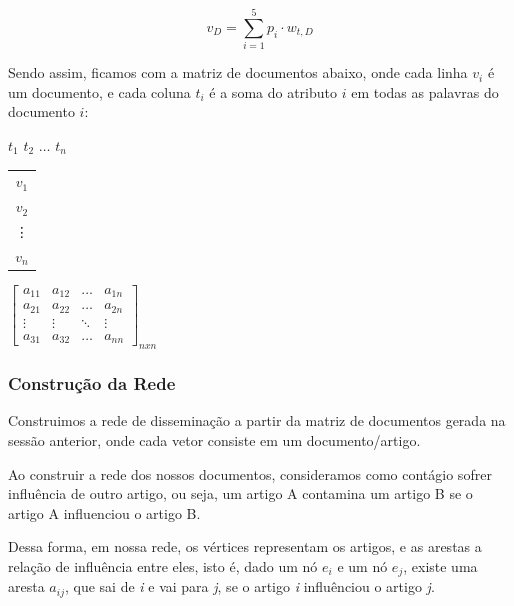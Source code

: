 \documentclass[a4paper,12pt]{article}
\begin{document}
  $$v_{D} = \sum_{i=1}^{5} p_{i} \cdot w_{t,D} $$

Sendo assim, ficamos com a matriz de documentos abaixo, onde cada linha $v_{i}$ é um documento, e cada coluna $t_{i}$ é a soma do atributo $i$
em todas as palavras do documento $i$:

 \begin{center}
 \hspace{0.2cm}$t_{1}$ \hspace{0.5cm} $t_{2}$ \hspace{0.3cm} $\hdots$ \hspace{0.4cm}$t_{n}$
 
 \vspace{0.2cm}
 
\begin{tabular}{c}
   $v_{1}$ \\
   $v_{2}$ \\
   \vdots\\
   $v_{n}$
 \end{tabular}
 $
 \begin{bmatrix}
  a_{11} & a_{12} & \hdots & a_{1n}\\
  a_{21} & a_{22} & \hdots & a_{2n}\\
  \vdots & \vdots & \ddots & \vdots\\
  a_{31} & a_{32} & \hdots & a_{nn}
 \end{bmatrix}_{nxn}
$

\end{center}



\subsubsection{Construção da Rede}

 Construimos a rede de disseminação a partir da matriz de documentos gerada na sessão anterior, onde cada vetor consiste em um documento/artigo.
 
 Ao construir a rede dos nossos documentos,
 consideramos como contágio sofrer influência de outro artigo, ou seja, um artigo A contamina um artigo B se o artigo A influenciou o
 artigo B.
 
 Dessa forma, em nossa rede, os vértices representam os artigos, e as arestas a relação de influência entre eles, isto é, dado um nó $e_{i}$ e um nó
 $e_{j}$, existe uma aresta $a_{ij}$, que sai de \textit{i} e vai para \textit{j}, se o artigo \textit{i} influênciou o artigo \textit{j}.
 
\end{document}
